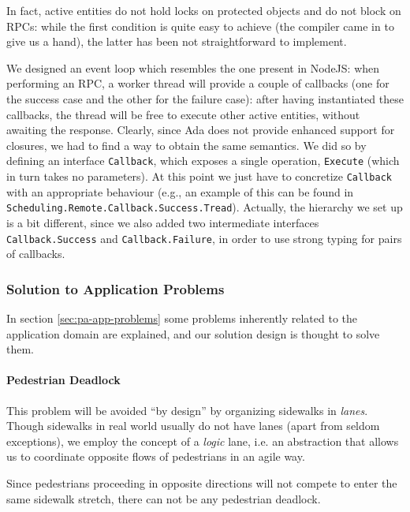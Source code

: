 In fact, active entities do not hold locks on protected objects and do not
block on RPCs: while the first condition is quite easy to achieve (the
compiler came in to give us a hand), the latter has been not straightforward
to implement.

We designed an event loop which resembles the one present in NodeJS: when
performing an RPC, a worker thread will provide a couple of callbacks (one for
the success case and the other for the failure case): after having instantiated
these callbacks, the thread will be free to execute other active entities,
without awaiting the response.
Clearly, since Ada does not provide enhanced support for closures, we had to
find a way to obtain the same semantics. We did so by defining an interface
\texttt{Callback}, which exposes a single operation, \texttt{Execute} (which
in turn takes no parameters). At this point we just have to concretize
\texttt{Callback} with an appropriate behaviour (e.g., an example of this can
be found in \texttt{Scheduling.Remote.Callback.Success.Tread}).
Actually, the hierarchy we set up is a bit different, since we also added two
intermediate interfaces \texttt{Callback.Success} and
\texttt{Callback.Failure}, in order to use strong typing for pairs of
callbacks.


\subsubsection{Solution to Application Problems}

In section \ref{sec:pa-app-problems} some problems inherently related to the
application domain are explained, and our solution design is thought to solve
them.

\paragraph{Pedestrian Deadlock}
This problem will be avoided ``by design'' by organizing sidewalks in
\textit{lanes}. Though sidewalks in real world usually do not have lanes (apart
from seldom exceptions), we employ the concept of a \textit{logic} lane, i.e.
an abstraction that allows us to coordinate opposite flows of pedestrians in an
agile way.

Since pedestrians proceeding in opposite directions will not compete to enter
the same sidewalk stretch, there can not be any pedestrian deadlock.

